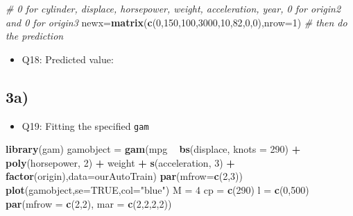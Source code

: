 \documentclass[]{article}
\newenvironment{Shaded}{\begin{snugshade}}{\end{snugshade}}
\newcommand{\KeywordTok}[1]{\textcolor[rgb]{0.13,0.29,0.53}{\textbf{#1}}}
\newcommand{\DataTypeTok}[1]{\textcolor[rgb]{0.13,0.29,0.53}{#1}}
\newcommand{\DecValTok}[1]{\textcolor[rgb]{0.00,0.00,0.81}{#1}}
\newcommand{\StringTok}[1]{\textcolor[rgb]{0.31,0.60,0.02}{#1}}
\newcommand{\CommentTok}[1]{\textcolor[rgb]{0.56,0.35,0.01}{\textit{#1}}}
\newcommand{\OtherTok}[1]{\textcolor[rgb]{0.56,0.35,0.01}{#1}}
\newcommand{\OperatorTok}[1]{\textcolor[rgb]{0.81,0.36,0.00}{\textbf{#1}}}
\newcommand{\NormalTok}[1]{#1}
\providecommand{\tightlist}{%
  \setlength{\itemsep}{0pt}\setlength{\parskip}{0pt}}
\begin{document}
\begin{Shaded}
\begin{Highlighting}[]
\CommentTok{# 0 for cylinder, displace, horsepower, weight, acceleration, year, 0 for origin2 and 0 for origin3}
\NormalTok{newx=}\KeywordTok{matrix}\NormalTok{(}\KeywordTok{c}\NormalTok{(}\DecValTok{0}\NormalTok{,}\DecValTok{150}\NormalTok{,}\DecValTok{100}\NormalTok{,}\DecValTok{3000}\NormalTok{,}\DecValTok{10}\NormalTok{,}\DecValTok{82}\NormalTok{,}\DecValTok{0}\NormalTok{,}\DecValTok{0}\NormalTok{),}\DataTypeTok{nrow=}\DecValTok{1}\NormalTok{)}
\CommentTok{# then do the prediction}
\end{Highlighting}
\end{Shaded}

\begin{itemize}
\tightlist
\item
  Q18: Predicted value:
\end{itemize}

\subsection{3a)}\label{a-1}

\begin{itemize}
\tightlist
\item
  Q19: Fitting the specified \texttt{gam}
\end{itemize}

\begin{Shaded}
\begin{Highlighting}[]
\KeywordTok{library}\NormalTok{(gam)}
\NormalTok{gamobject =}\StringTok{ }\KeywordTok{gam}\NormalTok{(mpg }\OperatorTok{~}\StringTok{ }\KeywordTok{bs}\NormalTok{(displace, }\DataTypeTok{knots  =} \DecValTok{290}\NormalTok{) }\OperatorTok{+}\StringTok{ }\KeywordTok{poly}\NormalTok{(horsepower, }\DecValTok{2}\NormalTok{)  }\OperatorTok{+}\StringTok{ }\NormalTok{weight }\OperatorTok{+}\StringTok{ }\KeywordTok{s}\NormalTok{(acceleration, }\DecValTok{3}\NormalTok{) }\OperatorTok{+}\StringTok{ }\KeywordTok{factor}\NormalTok{(origin),}\DataTypeTok{data=}\NormalTok{ourAutoTrain)}
\KeywordTok{par}\NormalTok{(}\DataTypeTok{mfrow=}\KeywordTok{c}\NormalTok{(}\DecValTok{2}\NormalTok{,}\DecValTok{3}\NormalTok{))}
\KeywordTok{plot}\NormalTok{(gamobject,}\DataTypeTok{se=}\OtherTok{TRUE}\NormalTok{,}\DataTypeTok{col=}\StringTok{"blue"}\NormalTok{)}
\NormalTok{M =}\StringTok{ }\DecValTok{4}
\NormalTok{cp =}\StringTok{ }\KeywordTok{c}\NormalTok{(}\DecValTok{290}\NormalTok{)}
\NormalTok{l =}\StringTok{ }\KeywordTok{c}\NormalTok{(}\DecValTok{0}\NormalTok{,}\DecValTok{500}\NormalTok{)}
\KeywordTok{par}\NormalTok{(}\DataTypeTok{mfrow =} \KeywordTok{c}\NormalTok{(}\DecValTok{2}\NormalTok{,}\DecValTok{2}\NormalTok{), }\DataTypeTok{mar =} \KeywordTok{c}\NormalTok{(}\DecValTok{2}\NormalTok{,}\DecValTok{2}\NormalTok{,}\DecValTok{2}\NormalTok{,}\DecValTok{2}\NormalTok{))}
\end{Highlighting}
\end{Shaded}
\end{document}
